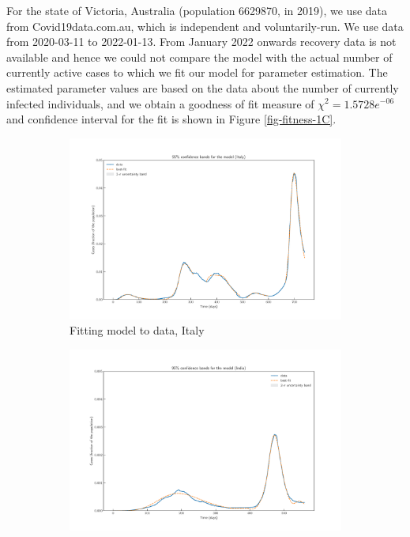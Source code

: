 \documentclass[10pt]{wlscirep}
\begin{document}
For the state of Victoria, Australia (population 6629870, in 2019), we use data from Covid19data.com.au, which is independent and voluntarily-run. We use data from 2020-03-11 to 2022-01-13. From January 2022 onwards  recovery data is not available and hence we could not compare the model with the actual number of currently active cases  to which we fit our model for parameter estimation.
 The estimated parameter values are based on the data about the number of currently infected individuals, and we obtain a goodness of fit measure of $\chi^2= 1.5728e^{-06}$ and confidence interval for the fit is shown in Figure \ref{fig-fitness-1C}. 
%
\begin{figure}[t!]
	\centering
	\begin{subfigure}{0.3\textwidth}
		\centering
		\includegraphics[width=\linewidth]{Italy_model_confidence.pdf}
		\caption{Fitting model to data, Italy}
		\label{fig-fitness-1A}
	\end{subfigure}%
	\begin{subfigure}{0.3\textwidth}
		\centering
		\includegraphics[width=\linewidth]{India_model_confidence.pdf}

\end{subfigure}
\end{figure}
\end{document}
